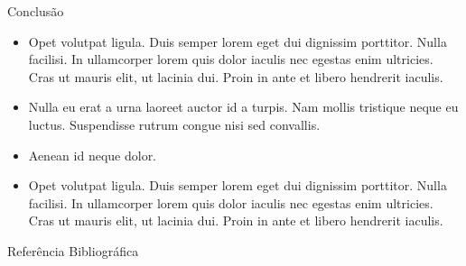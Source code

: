 \documentclass[final,hyperref={pdfpagelabels=false, brazil}]{beamer}
\begin{document}
\begin{frame}[t]
\begin{columns}[t]
\begin{column}{.465\textwidth}

\begin{block}{Conclus\~ao}

\begin{itemize}
\item Opet volutpat ligula. Duis semper lorem eget dui dignissim porttitor. Nulla facilisi. In ullamcorper lorem quis dolor iaculis nec egestas enim ultricies. Cras ut mauris elit, ut lacinia dui. Proin in ante et libero hendrerit iaculis.
\item Nulla eu erat a urna laoreet auctor id a turpis. Nam mollis tristique neque eu luctus. Suspendisse rutrum congue nisi sed convallis. 
\item Aenean id neque dolor.
\item Opet volutpat ligula. Duis semper lorem eget dui dignissim porttitor. Nulla facilisi. In ullamcorper lorem quis dolor iaculis nec egestas enim ultricies. Cras ut mauris elit, ut lacinia dui. Proin in ante et libero hendrerit iaculis.
\end{itemize}

\end{block}


\begin{block}{Refer\^encia Bibliogr\'afica}
        
\nocite{*} %
\small{
}

\end{block}








\end{column}
\end{columns}
\end{frame}
\end{document}
